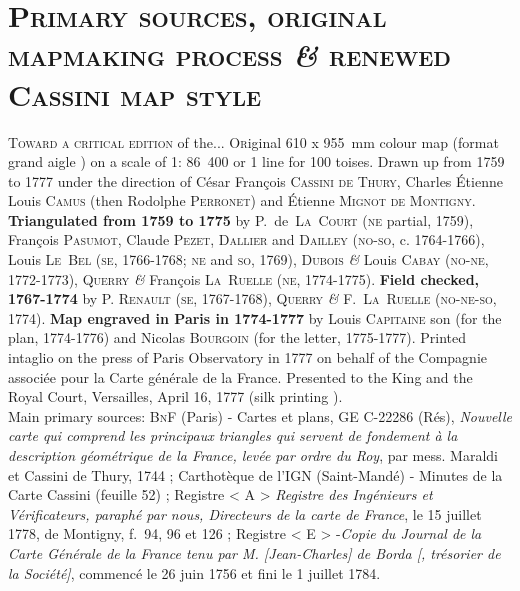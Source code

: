 \documentclass[portrait,a0]{sciposter}
\begin{document}
\begin{minipage}[b]{\textwidth}
  \section{\normalfont \textsc{Primary sources, original mapmaking process \textit{\&} renewed Cassini map style}}
  \begin{multicols}{3}
    \setlength{\columnsep}{80pt}
    \textsc{Toward a critical edition} \small{of the...}
    \vfill
    \normalsize
    \lettrine{O}riginal 610 x 955~mm colour map (format \og grand aigle \fg) on a scale of 1: 86~400 or 1 line for 100 toises. Drawn up from 1759 to 1777 under the direction of César François \textsc{Cassini de Thury}, Charles Étienne Louis \textsc{Camus} (then Rodolphe \textsc{Perronet}) and Étienne \textsc{Mignot de Montigny}. \textbf{Triangulated from 1759 to 1775} by P.~de~\textsc{La~Court} (\textsc{ne} partial, 1759), François \textsc{Pasumot}, Claude \textsc{Pezet}, \textsc{Dallier} and \textsc{Dailley} (\textsc{no-so}, c. 1764-1766), Louis \textsc{Le~Bel} (\textsc{se}, 1766-1768; \textsc{ne} and \textsc{so}, 1769), \textsc{Dubois} \textit{\&} Louis \textsc{Cabay} (\textsc{no-ne}, 1772-1773), Q\textsc{uerry} \textit{\&} François \textsc{La~Ruelle} (\textsc{ne}, 1774-1775). \textbf{Field checked, 1767-1774} by P. \textsc{Renault} (\textsc{se}, 1767-1768), Q\textsc{uerry} \textit{\&} F.~\textsc{La~Ruelle} (\textsc{no-ne-so}, 1774). \textbf{Map engraved in Paris in 1774-1777} by Louis \textsc{Capitaine} son (for the plan, 1774-1776) and Nicolas \textsc{Bourgoin} (for the letter, 1775-1777). Printed intaglio on the press of Paris Observatory in 1777 on behalf of the Compagnie associée pour la Carte générale de la France. Presented to the King and the Royal Court, Versailles, April 16, 1777 (\og silk printing \fg).\\
    \vfill
    \scriptsize Main primary sources: \textsc{BnF} (Paris) - Cartes et plans, GE C-22286 (Rés), \textit{Nouvelle carte qui comprend les principaux triangles qui servent de fondement à la description géométrique de la France, levée par ordre du Roy}, par mess. Maraldi et Cassini de Thury, 1744 ; Carthotèque de l'IGN (Saint-Mandé) - Minutes de la Carte Cassini (feuille 52) ; Registre < A > \textit{Registre des Ingénieurs et Vérificateurs, paraphé par nous, Directeurs de la carte de France}, le 15 juillet 1778, de Montigny, f.~94, 96 et 126 ; Registre  < E > -\textit{Copie du Journal de la Carte Générale de la France tenu par M. [Jean-Charles] de Borda [, trésorier de la Société]}, commencé le 26 juin 1756 et fini le 1 juillet 1784.

\end{multicols}
\end{minipage}
\end{document}
